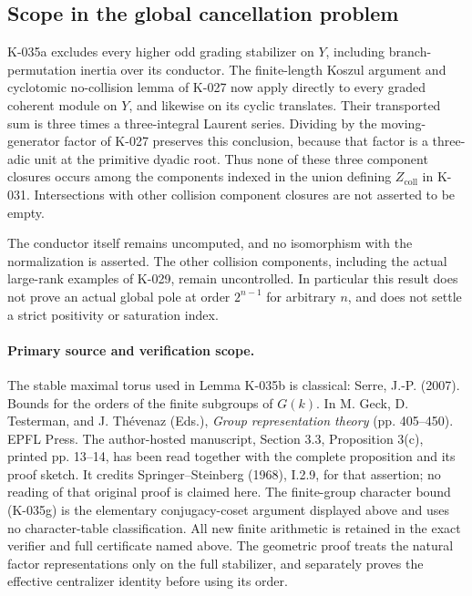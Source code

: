 \subsection*{Scope in the global cancellation problem}

K-035a excludes every higher odd grading stabilizer on $Y$,
including branch-permutation inertia over its conductor.  The
finite-length Koszul argument and cyclotomic no-collision lemma
of K-027 now apply directly to every graded coherent module on
$Y$, and likewise on its cyclic translates.  Their transported
sum is three times a three-integral Laurent series.  Dividing by
the moving-generator factor of K-027 preserves this conclusion,
because that factor is a three-adic unit at the primitive
dyadic root.  Thus none of these three component closures occurs
among the components indexed in the union defining
$Z_{\mathrm{coll}}$ in K-031.  Intersections with other collision
component closures are not asserted to be empty.

The conductor itself remains uncomputed, and no isomorphism with
the normalization is asserted.  The other collision components,
including the actual large-rank examples of K-029, remain
uncontrolled.  In particular this result does not prove an
actual global pole at order $2^{n-1}$ for arbitrary $n$, and
does not settle a strict positivity or saturation index.

\paragraph{Primary source and verification scope.}
The stable maximal torus used in Lemma K-035b is classical:
Serre, J.-P. (2007). Bounds for the orders of the finite subgroups
of $G(k)$. In M. Geck, D. Testerman, and J. Th\'evenaz (Eds.),
\emph{Group representation theory} (pp. 405--450). EPFL Press.
The author-hosted manuscript, Section 3.3, Proposition 3(c),
printed pp. 13--14, has been read together with the complete
proposition and its proof sketch.  It credits Springer--Steinberg
(1968), I.2.9, for that assertion; no reading of that original
proof is claimed here.  The finite-group character bound
(K-035g) is the elementary conjugacy-coset argument displayed
above and uses no character-table classification.  All new
finite arithmetic is retained in the exact verifier and full
certificate named above.  The geometric proof treats the natural
factor representations only on the full stabilizer, and separately
proves the effective centralizer identity before using its order.
